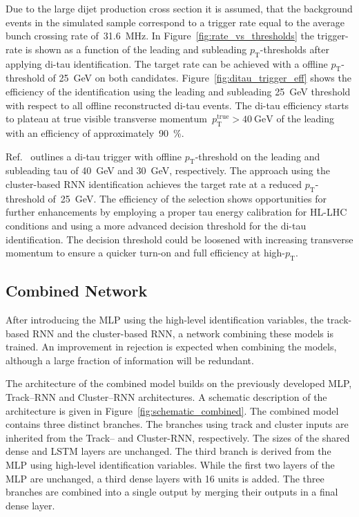 Due to the large dijet production cross section it is assumed, that the
background events in the simulated sample correspond to a trigger rate equal to
the average bunch crossing rate of~\SI{31.6}{\mega\hertz}. In
Figure~\ref{fig:rate_vs_thresholds} the trigger-rate is shown as a function of
the leading and subleading \tauhadvis $p_\text{T}$-thresholds after applying
di-tau identification. The target rate can be achieved with a offline
$p_\text{T}$-threshold of \SI{25}{\GeV} on both \tauhadvis candidates.
Figure~\ref{fig:ditau_trigger_eff} shows the efficiency of the identification
using the leading and subleading \SI{25}{\GeV} threshold with respect to all
offline reconstructed di-tau events. The di-tau efficiency starts to plateau at
true visible transverse momentum~$p_\text{T}^\text{true} > \SI{40}{\GeV}$ of the
leading \tauhadvis with an efficiency of approximately~\SI{90}{\percent}.

Ref.~\cite{phase_2_scoping} outlines a di-tau trigger with offline
$p_\text{T}$-threshold on the leading and subleading tau of \SI{40}{\GeV} and
\SI{30}{\GeV}, respectively. The approach using the cluster-based RNN
identification achieves the target rate at a reduced $p_\text{T}$-threshold
of~\SI{25}{\GeV}. The efficiency of the selection shows opportunities for
further enhancements by employing a proper tau energy calibration for HL-LHC
conditions and using a more advanced decision threshold for the di-tau
identification. The decision threshold could be loosened with increasing
transverse momentum to ensure a quicker turn-on and full efficiency at
high-$p_\text{T}$.

\subsection{Combined Network}
\label{sec:rnn_combined}

After introducing the MLP using the high-level identification variables, the
track-based RNN and the cluster-based RNN, a network combining these models is
trained. An improvement in rejection is expected when combining the models,
although a large fraction of information will be redundant.

The architecture of the combined model builds on the previously developed MLP,
Track--RNN and Cluster--RNN architectures. A schematic description of the
architecture is given in Figure~\ref{fig:schematic_combined}. The combined model
contains three distinct branches. The branches using track and cluster inputs
are inherited from the Track-- and Cluster-RNN, respectively. The sizes of the
shared dense and LSTM layers are unchanged. The third branch is derived from the
MLP using high-level identification variables. While the first two layers of the
MLP are unchanged, a third dense layers with 16 units is added. The three
branches are combined into a single output by merging their outputs in a final
dense layer.

